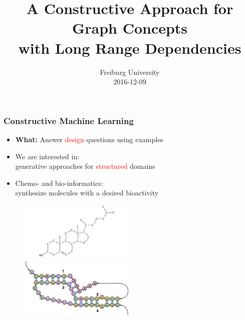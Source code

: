 \documentclass{beamer}
\title 
{A Constructive Approach for Graph Concepts \\
with Long Range Dependencies}
\author %
{Fabrizio Costa  \and \underline{Stefan Mautner}
    \small{ 
        \texttt{
            \href{mailto:costa@informatik.uni-freiburg.de}
            {costa@informatik.uni-freiburg.de}}
            \texttt{
            \href{mailto:mautner@informatik.uni-freiburg.de}
            {mautner@informatik.uni-freiburg.de}}
        }
}
\date 
{Freiburg University \\2016-12-09}
\newcommand{\red}[1]{\textcolor{red}{#1}}
\begin{document}
\frame{\titlepage}



\begin{frame}
\frametitle{Constructive Machine Learning}

    \begin{itemize}
        \item {\bf What:} Answer \red{design} questions using examples
        \item We are interested in: \\generative approaches for \red{structured} domains
        \item Chemo- and bio-informatics: \\synthesize molecules with a desired bioactivity
    \end{itemize}
    \begin{figure}
        \centering
        \includegraphics[width=0.5\textwidth]{images/mol.jpg}
        \includegraphics[width=0.5\textwidth]{images/rna.png}
    \end{figure}    
\end{frame}
\end{document}
